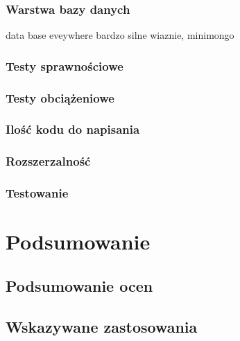 \documentclass[12pt]{report}
\begin{document}
    \subsection{Warstwa bazy danych}
      data base eveywhere bardzo silne wiaznie, minimongo
    \subsection{Testy sprawnościowe}
    \subsection{Testy obciążeniowe}
    \subsection{Ilość kodu do napisania}
    \subsection{Rozszerzalność}
    \subsection{Testowanie}
    

\chapter{Podsumowanie}
  \section{Podsumowanie ocen}
  \section{Wskazywane zastosowania}

\end{document}
